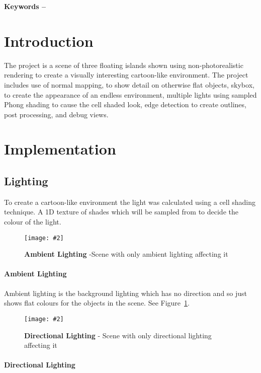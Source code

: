 \documentclass[10pt, a4paper]{article}
\title{\mytitle}
\author{\myauthor\hspace{1em}\\\contact\\Edinburgh Napier University\hspace{0.5em}-\hspace{0.5em}\mymodule}
\date{}
\newcommand{\figuremacro}[5]{
    \begin{figure}[#1]
        \centering
        \texttt{[image: \#2]}
        \caption[#3]{\textbf{#3}#4}
        \label{fig:#2}
    \end{figure}
}
\begin{document}
	\maketitle
	\begin{abstract}
		This project aims to render a 3D environment in real-time,
		using OpenGL and C++. The intent is to create a 3D
		scene shaded as if it where a cartoon
	\end{abstract}
    
	\textbf{Keywords -- }{\mykeywords}
	\section{Introduction}
    The project is a scene of three floating islands shown using non-photorealistic rendering to create a visually interesting cartoon-like environment. The project includes use of normal mapping, to show detail on otherwise flat objects, skybox, to create the appearance of an endless environment, multiple lights using sampled Phong shading to cause the cell shaded look, edge detection to create outlines, post processing, and debug views. 
    
    \section{Implementation}
    \subsection{Lighting}
    To create a cartoon-like environment the light was calculated using a cell shading technique. A 1D texture of shades which will be sampled from to decide the colour of the light.
	
	\figuremacro{h}{Ambient}{Ambient Lighting}{ -Scene with only ambient lighting affecting it}{1.0}
	
	\paragraph{Ambient Lighting}
	
	Ambient lighting is the background lighting which has no direction and so just shows flat colours for the objects in the scene. See Figure~\ref{fig:Ambient}.
	
	\figuremacro{h}{Directional}{Directional Lighting}{ - Scene with only directional lighting affecting it}{1.0}
	
	\paragraph{Directional Lighting}
	 
\end{document}
